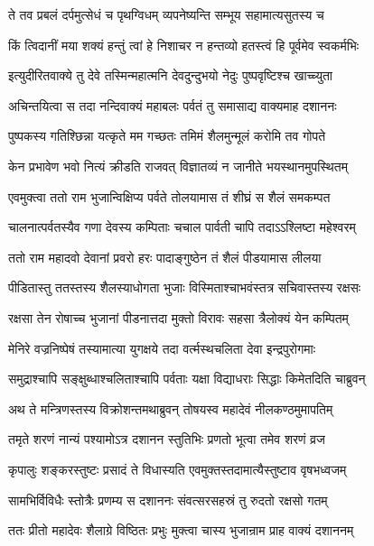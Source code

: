 \twolineshloka
{ते तव प्रबलं दर्पमुत्सेधं च पृथग्विधम्}
{व्यपनेष्यन्ति सम्भूय सहामात्यसुतस्य च} %

\twolineshloka
{किं त्विदानीं मया शक्यं हन्तुं त्वां हे निशाचर}
{न हन्तव्यो हतस्त्वं हि पूर्वमेव स्वकर्मभिः} %

\twolineshloka
{इत्युदीरितवाक्ये तु देवे तस्मिन्महात्मनि}
{देवदुन्दुभयो नेदुः पुष्पवृष्टिश्च खाच्च्युता} %

\twolineshloka
{अचिन्तयित्वा स तदा नन्दिवाक्यं महाबलः}
{पर्वतं तु समासाद्य वाक्यमाह दशाननः} %

\twolineshloka
{पुष्पकस्य गतिश्छिन्ना यत्कृते मम गच्छतः}
{तमिमं शैलमुन्मूलं करोमि तव गोपते} %

\twolineshloka
{केन प्रभावेण भवो नित्यं क्रीडति राजवत्}
{विज्ञातव्यं न जानीते भयस्थानमुपस्थितम्} %

\twolineshloka
{एवमुक्त्वा ततो राम भुजान्विक्षिप्य पर्वते}
{तोलयामास तं शीघ्रं स शैलं समकम्पत} %

\twolineshloka
{चालनात्पर्वतस्यैव गणा देवस्य कम्पिताः}
{चचाल पार्वती चापि तदाऽऽश्लिष्टा महेश्वरम्} %

\twolineshloka
{ततो राम महादवो देवानां प्रवरो हरः}
{पादाङ्गुष्ठेन तं शैलं पीडयामास लीलया} %

\twolineshloka
{पीडितास्तु ततस्तस्य शैलस्याधोगता भुजाः}
{विस्मिताश्चाभवंस्तत्र सचिवास्तस्य रक्षसः} %

\twolineshloka
{रक्षसा तेन रोषाच्च भुजानां पीडनात्तदा}
{मुक्तो विरावः सहसा त्रैलोक्यं येन कम्पितम्} %

\twolineshloka
{मेनिरे वज्रनिष्पेषं तस्यामात्या युगक्षये}
{तदा वर्त्मस्थचलिता देवा इन्द्रपुरोगमाः} %

\twolineshloka
{समुद्राश्चापि सङ्क्षुब्धाश्चलिताश्चापि पर्वताः}
{यक्षा विद्याधराः सिद्धाः किमेतदिति चाब्रुवन्} %

\twolineshloka
{अथ ते मन्त्रिणस्तस्य विक्रोशन्तमथाब्रुवन्}
{तोषयस्व महादेवं नीलकण्ठमुमापतिम्} %

\twolineshloka
{तमृते शरणं नान्यं पश्यामोऽत्र दशानन}
{स्तुतिभिः प्रणतो भूत्वा तमेव शरणं व्रज} %

\twolineshloka
{कृपालुः शङ्करस्तुष्टः प्रसादं ते विधास्यति}
{एवमुक्तस्तदामात्यैस्तुष्टाव वृषभध्वजम्} %

\twolineshloka
{सामभिर्विविधैः स्तोत्रैः प्रणम्य स दशाननः}
{संवत्सरसहस्रं तु रुदतो रक्षसो गतम्} %

\twolineshloka
{ततः प्रीतो महादेवः शैलाग्रे विष्ठितः प्रभुः}
{मुक्त्वा चास्य भुजान्राम प्राह वाक्यं दशाननम्} %

